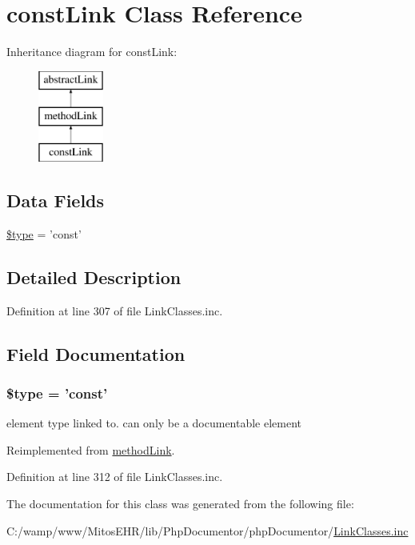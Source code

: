 \hypertarget{classconst_link}{\section{const\-Link \-Class \-Reference}
\label{classconst_link}
}
\-Inheritance diagram for const\-Link\-:\begin{figure}[H]
\begin{center}
\leavevmode
\includegraphics[height=3.000000cm]{classconst_link}
\end{center}
\end{figure}
\subsection*{\-Data \-Fields}
\begin{DoxyCompactItemize}
\item 
\hyperlink{classconst_link_a9a4a6fba2208984cabb3afacadf33919}{\$type} = 'const'
\end{DoxyCompactItemize}


\subsection{\-Detailed \-Description}


\-Definition at line 307 of file \-Link\-Classes.\-inc.



\subsection{\-Field \-Documentation}
\hypertarget{classconst_link_a9a4a6fba2208984cabb3afacadf33919}{
\subsubsection[{\$type}]{\setlength{\rightskip}{0pt plus 5cm}\$type = 'const'}}\label{classconst_link_a9a4a6fba2208984cabb3afacadf33919}
element type linked to. can only be a documentable element 

\-Reimplemented from \hyperlink{classmethod_link_a9a4a6fba2208984cabb3afacadf33919}{method\-Link}.



\-Definition at line 312 of file \-Link\-Classes.\-inc.



\-The documentation for this class was generated from the following file\-:\begin{DoxyCompactItemize}
\item 
\-C\-:/wamp/www/\-Mitos\-E\-H\-R/lib/\-Php\-Documentor/php\-Documentor/\hyperlink{_link_classes_8inc}{\-Link\-Classes.\-inc}\end{DoxyCompactItemize}
